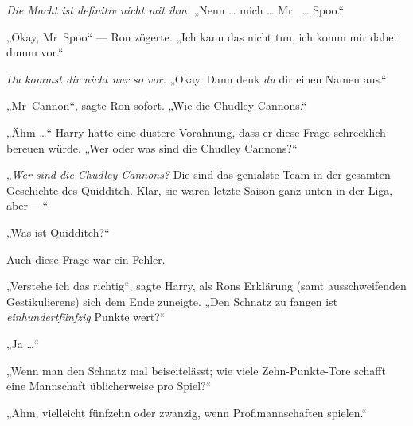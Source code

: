 \emph{Die Macht ist definitiv nicht mit ihm.}
„Nenn … mich … Mr~ … Spoo.“

„Okay, Mr~Spoo“ — Ron zögerte.
„Ich kann das nicht tun, ich komm mir dabei dumm vor.“

\emph{Du kommst dir nicht nur so vor.}
„Okay. Dann denk \emph{du} dir einen Namen aus.“

„Mr~Cannon“, sagte Ron sofort.
„Wie die Chudley Cannons.“

„Ähm …“ Harry hatte eine düstere Vorahnung, dass er diese Frage schrecklich bereuen würde.
„Wer oder was sind die Chudley Cannons?“

„\emph{Wer sind die Chudley Cannons?} Die sind das genialste Team in der gesamten Geschichte des Quidditch. Klar, sie waren letzte Saison ganz unten in der Liga, aber —“

„Was ist Quidditch?“

Auch diese Frage war ein Fehler.

„Verstehe ich das richtig“, sagte Harry, als Rons Erklärung (samt ausschweifenden Gestikulierens) sich dem Ende zuneigte.
„Den Schnatz zu fangen ist \emph{einhundertfünfzig} Punkte wert?“

„Ja …“

„Wenn man den Schnatz mal beiseitelässt; wie viele Zehn-Punkte-Tore schafft eine Mannschaft üblicherweise pro Spiel?“

„Ähm, vielleicht fünfzehn oder zwanzig, wenn Profimannschaften spielen.“

